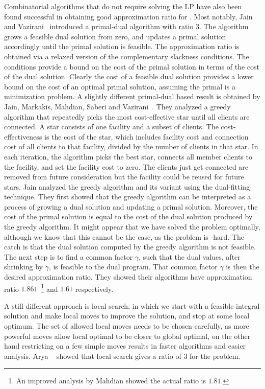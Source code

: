 \documentclass[oneside,final]{ucr}
\begin{document}
Combinatorial algorithms that do not require solving the LP
have also been found successful in obtaining good
approximation ratio for {\UFL}. Most notably, Jain and
Vazirani~\cite{JainV01} introduced a primal-dual algorithm
with ratio $3$. The algorithm grows a feasible dual solution
from zero, and updates a primal solution accordingly until
the primal solution is feasible. The approximation ratio is
obtained via a relaxed version of the complementary
slackness conditions. The conditions provide a bound on the
cost of the primal solution in terms of the cost of the dual
solution. Clearly the cost of a feasible dual solution
provides a lower bound on the cost of an optimal primal
solution, assuming the primal is a minimization problem. A
slightly different primal-dual based result is obtained by
Jain, Markakis, Mahdian, Saberi and
Vazirani~\cite{JainMMSV03}. They analyzed a greedy algorithm
that repeatedly picks the most cost-effective star until all
clients are connected. A star consists of one facility and a
subset of clients. The cost-effectiveness is the cost of the
star, which includes facility cost and connection cost of
all clients to that facility, divided by the number of
clients in that star. In each iteration, the algorithm picks
the best star, connects all member clients to the facility,
and set the facility cost to zero. The clients just get
connected are removed from future consideration but the
facility could be reused for future stars. Jain {\etal}
analyzed the greedy algorithm and its variant using the
dual-fitting technique. They first showed that the greedy
algorithm can be interpreted as a process of growing a dual
solution and updating a primal solution. Moreover, the cost
of the primal solution is equal to the cost of the dual
solution produced by the greedy algorithm. It might appear
that we have solved the {\UFL} problem optimally, although
we know that this cannot be the case, as the {\UFL} problem
is {\NP}-hard. The catch is that the dual solution computed
by the greedy algorithm is not feasible. The next step is to
find a common factor $\gamma$, such that the dual values,
after shrinking by $\gamma$, is feasible to the dual
program. That common factor $\gamma$ is then the desired
approximation ratio. They showed their algorithms have
approximation ratio $1.861$~\footnote{An improved analysis
  by Mahdian showed the actual ratio is $1.81$.} and $1.61$
respectively.

A still different approach is local search, in which we
start with a feasible integral solution and make local moves
to improve the solution, and stop at some local optimum. The
set of allowed local moves needs to be chosen carefully, as
more powerful moves allow local optimal to be closer to
global optimal, on the other hand restricting on a few
simple moves results in faster algorithms and easier
analysis. Arya {\etal}~\cite{AryaGKMMP01} showed that local
search gives a ratio of $3$ for the {\UFL} problem.
\end{document}
